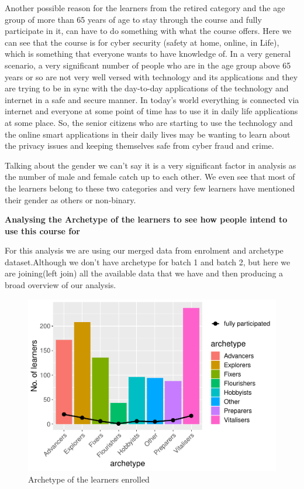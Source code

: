 \documentclass[
]{article}
\begin{document}
Another possible reason for the learners from the retired category and
the age group of more than 65 years of age to stay through the course
and fully participate in it, can have to do something with what the
course offers. Here we can see that the course is for cyber security
(safety at home, online, in Life), which is something that everyone
wants to have knowledge of. In a very general scenario, a very
significant number of people who are in the age group above 65 years or
so are not very well versed with technology and its applications and
they are trying to be in sync with the day-to-day applications of the
technology and internet in a safe and secure manner. In today's world
everything is connected via internet and everyone at some point of time
has to use it in daily life applications at some place. So, the senior
citizens who are starting to use the technology and the online smart
applications in their daily lives may be wanting to learn about the
privacy issues and keeping themselves safe from cyber fraud and crime.

Talking about the gender we can't say it is a very significant factor in
analysis as the number of male and female catch up to each other. We
even see that most of the learners belong to these two categories and
very few learners have mentioned their gender as others or non-binary.

\textbf{Analysing the Archetype of the learners to see how people intend
to use this course for }

For this analysis we are using our merged data from enrolment and
archetype dataset.Although we don't have archetype for batch 1 and batch
2, but here we are joining(left join) all the available data that we
have and then producing a broad overview of our analysis.

\begin{figure}
\includegraphics[width=1\linewidth]{CSC8631-Reports_files/figure-latex/unnamed-chunk-4-1} \caption{Archetype of the learners enrolled}\label{fig:unnamed-chunk-4}
\end{figure}
\end{document}

